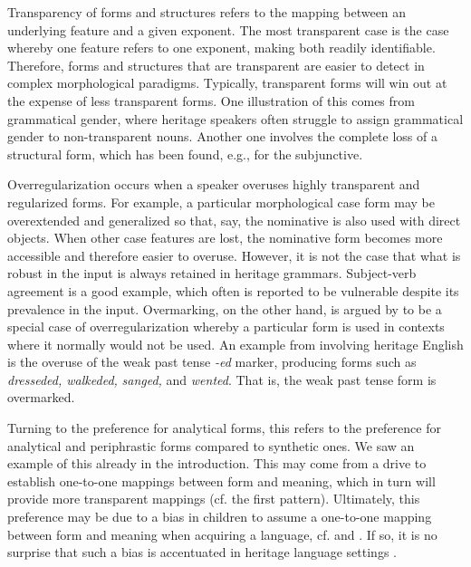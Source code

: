 \documentclass[output=paper,colorlinks,citecolor=brown,footheight=42pt]{langscibook}
\begin{document}
Transparency of forms and structures refers to the mapping between an underlying feature and a given exponent. The most transparent case is the case whereby one feature refers to one exponent, making both readily identifiable. Therefore, forms and structures that are transparent are easier to detect in complex morphological paradigms. Typically, transparent forms will win out at the expense of less transparent forms. One illustration of this comes from grammatical gender, where heritage speakers often struggle to assign grammatical gender to non-transparent nouns. Another one involves the complete loss of a structural form, which has been found, e.g., for the subjunctive.

Overregularization occurs when a speaker overuses highly transparent and regularized forms. For example, a particular morphological case form may be overextended and generalized so that, say, the nominative is also used with direct objects. When other case features are lost, the nominative form becomes more accessible and therefore easier to overuse. However, it is not the case that what is robust in the input is always retained in heritage grammars. Subject-verb agreement is a good example, which often is reported to be vulnerable despite its prevalence in the input. Overmarking, on the other hand, is argued by \citet{putnametal2021} to be a special case of overregularization whereby a particular form is used in contexts where it normally would not be used. An example from \citet{polinsky2018heritage} involving heritage English is the overuse of the weak past tense {\itshape -ed} marker, producing forms such as {\itshape dresseded, walkeded,} {\itshape sanged,} and {\itshape wented}. That is, the weak past tense form is overmarked.

Turning to the preference for analytical forms, this refers to the preference for analytical and periphrastic forms compared to synthetic ones. We saw an example of this already in the introduction. This may come from a drive to establish one-to-one mappings between form and meaning, which in turn will provide more transparent mappings (cf. the first pattern). Ultimately, this preference may be due to a bias in children to assume a one-to-one mapping between form and meaning when acquiring a language, cf. \citet{slobin1973} and \citet{vanHout2008}. If so, it is no surprise that such a bias is accentuated in heritage language settings  \citep{polinsky2018heritage}.
\end{document}
